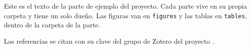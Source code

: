 
Este es el texto de la parte de ejemplo del proyecto.
Cada parte vive en su propia carpeta y tiene un solo dueño.
Las figuras van en \texttt{figures} y las tablas en \texttt{tables}, dentro de la carpeta de la parte.

Las referencias se citan con su clave del grupo de Zotero del proyecto \parencite{knuthTeXbook1984}.
